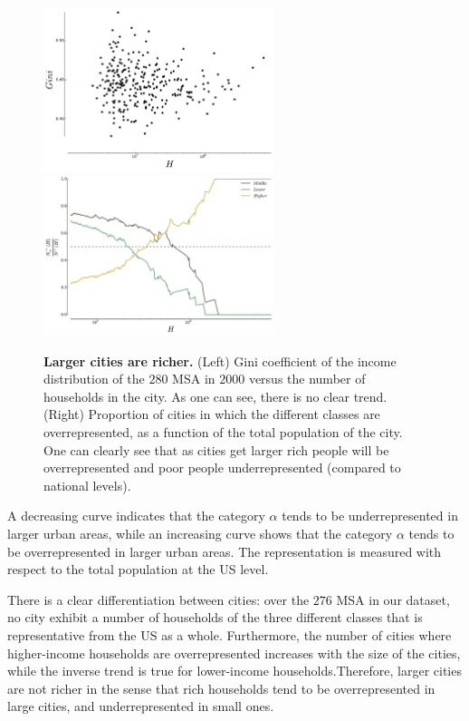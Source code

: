 \begin{figure}[!h]
    \centering
    \includegraphics[width=0.6\textwidth]{./gfx/chapter-segregation/gini_income.pdf}
    \includegraphics[width=0.6\textwidth]{gfx/chapter-segregation/figure3.pdf}
    \caption{{\bf Larger cities are richer.} (Left) Gini coefficient of the income distribution of the $280$ MSA in
    $2000$ versus the number of households in the city. As one can see, there is
    no clear trend. (Right) Proportion of cities in which the different classes are
    overrepresented, as a function of the total population of the city. One can
    clearly see that as cities get larger rich people will
    be overrepresented and poor people underrepresented (compared to national
    levels). \label{fig:inter-urban}}
\end{figure}

A decreasing curve indicates that the category $\alpha$ tends to be
underrepresented in larger urban areas, while an increasing curve shows that the
category $\alpha$ tends to be overrepresented in larger urban areas.  The
representation is measured with respect to the total population at the US level.

There is a clear differentiation between cities: over the $276$ MSA in our
dataset, no city exhibit a number of households of the three different classes
that is representative from the US as a whole. Furthermore, the number of cities
where higher-income households are overrepresented increases with the size of
the cities, while the inverse trend is true for lower-income
households.Therefore, larger cities are not richer in the sense that rich
households tend to be overrepresented in large cities, and underrepresented in
small ones.

